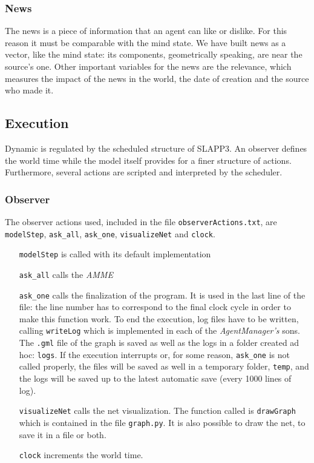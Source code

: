 \subsubsection{News}\label{subsubsec:news}
The news is a piece of information that an agent can like or dislike.
For this reason it must be comparable with the mind state.
We have built news as a vector, like the mind state:
its components, geometrically speaking, are near the source's one.
Other important variables for the news are the relevance,
which measures the impact of the news in the world, the
date of creation and the source who made it.

\subsection{Execution}\label{subsec:execution}
Dynamic is regulated by the scheduled structure of SLAPP3. An observer defines
the world time while the model itself provides for a finer structure of
actions. Furthermore, several actions are scripted and interpreted by
the scheduler.

\subsubsection{Observer}\label{subsubsec:observer}
The observer actions used, included in the file \texttt{observerActions.txt},
are \texttt{modelStep}, \texttt{ask\_all}, \texttt{ask\_one},
\texttt{visualizeNet} and \texttt{clock}.
\begin{itemize}
\item [\texttt{modelStep}] is called with its default implementation
\item [\texttt{ask\_all}] calls the \textit{AMME}
\item [\texttt{ask\_one}] calls the finalization of the program. It
  is used in the last line of the file: the line number has to correspond
  to the final clock cycle in order to make this function work.
  To end the execution, log files have to be written, calling
  \texttt{writeLog} which is implemented in each of the \textit{AgentManager's}
  sons. The \texttt{.gml} file of the graph is saved as well as the logs
  in a folder created ad hoc: \texttt{logs}.
  If the execution interrupts or, for some reason, \texttt{ask\_one} is not
  called properly, the files will be saved as well in a temporary folder,
  \texttt{temp}, and the logs will be saved up to the latest
  automatic save (every 1000 lines of log).
\item [\texttt{visualizeNet}] calls the net visualization. The function called
  is \texttt{drawGraph} which is contained in the file \texttt{graph.py}.
  It is also possible to draw the net, to save it in a file or both.
\item [\texttt{clock}] increments the world time.
\end{itemize}

